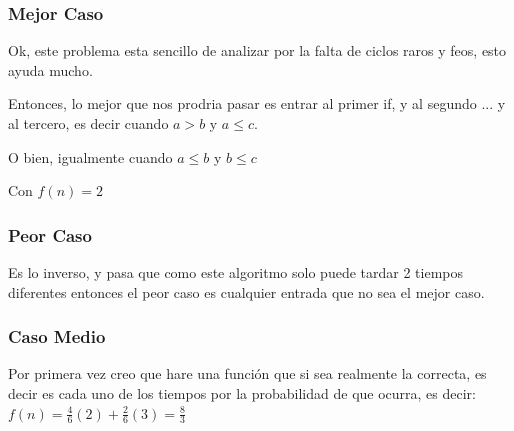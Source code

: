\documentclass[12pt, fleqn]{article}                            %
\theoremstyle{break}                                            %
\begin{document}
        \subsubsection{Mejor Caso}

            Ok, este problema esta sencillo de analizar por la falta de ciclos raros y feos,
            esto ayuda mucho.

            Entonces, lo mejor que nos prodria pasar es entrar al primer if, y al segundo ... y al
            tercero, es decir cuando $a > b$ y $a \leq c$.

            O bien, igualmente cuando $a \leq b$ y $b \leq c$

            Con $f(n) = 2$



        \subsubsection{Peor Caso}


            Es lo inverso, y pasa que como este algoritmo solo puede tardar 2 tiempos diferentes
            entonces el peor caso es cualquier entrada que no sea el mejor caso.



        \subsubsection{Caso Medio}

            Por primera vez creo que hare una función que si sea realmente la correcta, es decir
            es cada uno de los tiempos por la probabilidad de que ocurra, es decir:
            $f(n) = \frac{4}{6}(2) + \frac{2}{6}(3) = \frac{8}{3}$




    \clearpage
\end{document}
